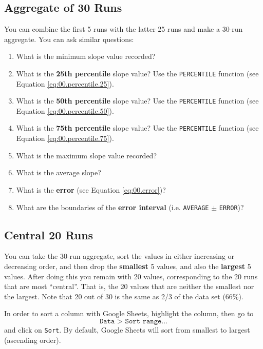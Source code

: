 \subsection{Aggregate of 30 Runs} \label{sec:01.all.30}
You can combine the first 5 runs with the latter 25 runs and make a 30-run aggregate. You can ask similar questions:
\begin{enumerate}
    \item What is the minimum slope value recorded?
    \item What is the \textbf{25th percentile} slope value? Use the \texttt{PERCENTILE} function (see Equation \ref{eq:00.percentile.25}).
    \item What is the \textbf{50th percentile} slope value? Use the \texttt{PERCENTILE} function (see Equation \ref{eq:00.percentile.50}).
    \item What is the \textbf{75th percentile} slope value? Use the \texttt{PERCENTILE} function (see Equation \ref{eq:00.percentile.75}).
    \item What is the maximum slope value recorded?
    \item What is the average slope?
    \item What is the \textbf{error} (see Equation \ref{eq:00.error})?
    \item What are the boundaries of the \textbf{error interval} (i.e. \texttt{AVERAGE} $\pm$ \texttt{ERROR})?
\end{enumerate}
\subsection{Central 20 Runs} \label{sec:01.central.20}
You can take the 30-run aggregate, sort the values in either increasing or decreasing order, and then drop the \textbf{smallest} 5 values, and also the \textbf{largest} 5 values. After doing this you remain with 20 values, corresponding to the 20 runs that are most ``central''. That is, the 20 values that are neither the smallest nor the largest. Note that 20 out of 30 is the same as 2/3 of the data set (66\%).

In order to sort a column with Google Sheets, highlight the column, then go to
\begin{equation}
    \texttt{Data > Sort range...}
\end{equation}
and click on \texttt{Sort}. By default, Google Sheets will sort from smallest to largest (ascending order).

